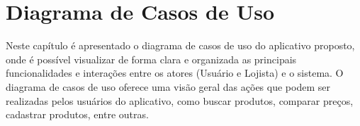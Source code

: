\chapter{Diagrama de Casos de Uso} \label{cha:diagramacasouso}

Neste capítulo é apresentado o diagrama de casos de uso do aplicativo proposto, onde é possível visualizar de forma clara e organizada as principais funcionalidades e interações entre os atores (Usuário e Lojista) e o sistema. O diagrama de casos de uso oferece uma visão geral das ações que podem ser realizadas pelos usuários do aplicativo, como buscar produtos, comparar preços, cadastrar produtos, entre outras.


